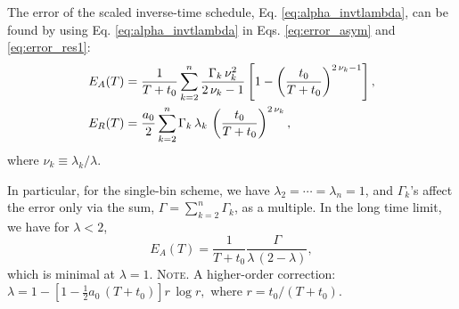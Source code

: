 \documentclass[reprint, superscriptaddress, floatfix]{revtex4-1}
\newcommand{\note}[1]{{\color{DarkGreen}\footnotesize \textsc{Note.} #1}}
\newcommand{\Err}{E}
\begin{document}
The error of the scaled inverse-time schedule,
Eq. \eqref{eq:alpha_invtlambda},
can be found by using Eq. \eqref{eq:alpha_invtlambda}
in Eqs. \eqref{eq:error_asym} and \eqref{eq:error_res1}:
%
\begin{align}
  \Err_A(T)
  &=
  \frac{    1    }
       { T + t_0 }
  \sum_{k = 2}^n
    \frac{ \Gamma_k \, \nu_k^2 }
         {    2 \, \nu_k - 1   }
  \left[
    1 - \left(
          \frac {     t_0 }
                { T + t_0 }
        \right)^{ 2 \, \nu_k - 1 }
  \right]
  ,
  \notag
  \\
  \Err_R(T)
  &=
  \frac { a_0 } { 2 }
  \sum_{k = 2}^n
  \Gamma_k \, \lambda_k \,
  \left(
      \frac{   t_0   }
           { T + t_0 }
  \right)^{ 2 \, \nu_k }
  ,
  \notag
\end{align}
%
where $\nu_k \equiv \lambda_k / \lambda$.
%
%
%



In particular,
for the single-bin scheme, we have
$\lambda_2 = \cdots = \lambda_n = 1$,
and
$\Gamma_k$'s affect the error
only via the sum, $\Gamma = \sum_{k = 2}^n \Gamma_k$,
as a multiple.
%
In the long time limit,
we have for $\lambda < 2$,
$$
  \Err_A(T)
  =
  \frac { 1 } { T + t_0 }
  \frac {         \Gamma           }
        { \lambda \, (2 - \lambda) }
  ,
$$
which is minimal at $\lambda = 1$.
%
\note{A higher-order correction:
  $
  \lambda = 1 -
  \left[
    1 - \frac 1 2 a_0 \, (T+t_0)
  \right] r \, \log r
  ,
  $
  where $r = t_0 / (T + t_0)$.
}
\end{document}
